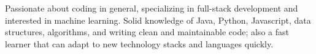 

\begin{cvparagraph}

Passionate about coding in general, specializing in full-stack development and interested in machine learning. Solid knowledge of Java, Python, Javascript, data structures, algorithms, and writing clean and maintainable code; also a fast learner that can adapt to new technology stacks and languages quickly.
\end{cvparagraph}
